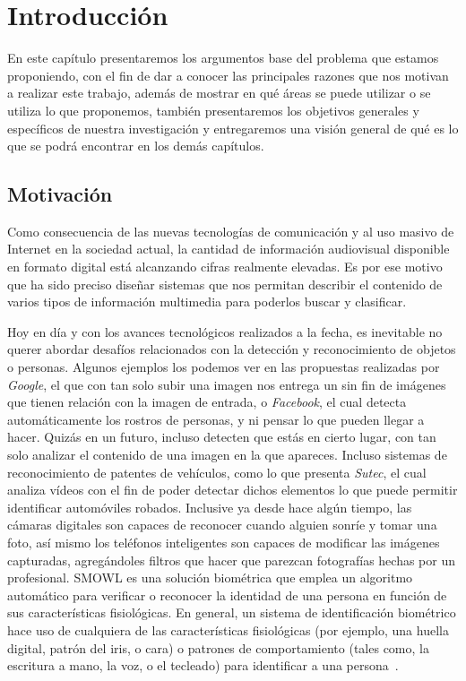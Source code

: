 \chapter[Introducción]{Introducción}\label{ch:capitulo1}
En este capítulo presentaremos los argumentos base del problema que estamos proponiendo, con el fin de dar a conocer las principales razones que nos motivan a realizar este trabajo, además de mostrar en qué áreas se puede utilizar o se utiliza lo que proponemos, también presentaremos los objetivos generales y específicos de nuestra investigación y entregaremos una visión general de qué es lo que se podrá encontrar en los demás capítulos.


\section{Motivación}\label{chsub:Motivación}

Como consecuencia de las nuevas tecnologías de comunicación y al uso masivo de Internet en la sociedad actual, la cantidad de información audiovisual disponible en formato digital está alcanzando cifras realmente elevadas. Es por ese motivo que ha sido preciso diseñar sistemas que nos permitan describir el contenido de varios tipos de información multimedia para poderlos buscar y clasificar.

Hoy en día y con los avances tecnológicos realizados a la fecha, es inevitable no querer abordar desafíos relacionados con la detección y reconocimiento de objetos o personas. Algunos ejemplos los podemos ver en las propuestas realizadas por \textit{Google}, el que con tan solo subir una imagen nos entrega un sin fin de imágenes que tienen relación con la imagen de entrada, o \textit{Facebook}, el cual detecta automáticamente los rostros de personas, y ni pensar lo que pueden llegar a hacer. Quizás en un futuro, incluso detecten que estás en cierto lugar, con tan solo analizar el contenido de una imagen en la que apareces. Incluso sistemas de reconocimiento de patentes de vehículos, como lo que presenta \textit{Sutec}, el cual analiza vídeos con el fin de poder detectar dichos elementos lo que puede permitir identificar automóviles robados. Inclusive ya desde hace algún tiempo, las cámaras digitales son capaces de reconocer cuando alguien sonríe y tomar una foto, así mismo los teléfonos inteligentes son capaces de modificar las imágenes capturadas, agregándoles filtros que hacer que parezcan fotografías hechas por un profesional. SMOWL es una solución biométrica que emplea un algoritmo automático para verificar o reconocer la identidad de una persona en función de sus características fisiológicas. En general, un sistema de identificación biométrico hace uso de cualquiera de las características fisiológicas (por ejemplo, una huella digital, patrón del iris, o cara) o patrones de comportamiento (tales como, la escritura a mano, la voz, o el tecleado) para identificar a una persona~\cite{SMOWL}.

